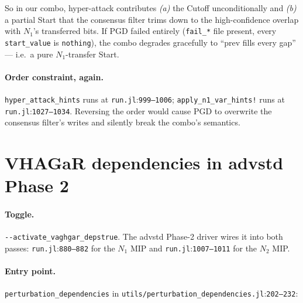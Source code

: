 \documentclass[11pt]{article}
\newcommand{\src}[1]{\texttt{\small #1}}
\newcommand{\flag}[1]{\texttt{-{}-#1}}
\newcommand{\fileline}[2]{\src{#1}:\src{#2}}
\begin{document}
So in our combo, hyper-attack contributes \emph{(a)} the Cutoff
unconditionally and \emph{(b)} a partial Start that the consensus
filter trims down to the high-confidence overlap with $N_1$'s
transferred bits. If PGD failed entirely (\src{fail\_*} file
present, every \src{start\_value} is \src{nothing}), the combo
degrades gracefully to ``prev fills every gap'' --- i.e.\ a pure
$N_1$-transfer Start.

\paragraph{Order constraint, again.} \src{hyper\_attack\_hints} runs
at \fileline{run.jl}{999--1006}; \src{apply\_n1\_var\_hints!} runs at
\fileline{run.jl}{1027--1034}. Reversing the order would cause PGD to
overwrite the consensus filter's writes and silently break the
combo's semantics.

\section{VHAGaR dependencies in advstd Phase 2}
\label{sec:vagharddeps}

\paragraph{Toggle.} \flag{activate\_vaghgar\_deps}\;\texttt{true}.
The advstd Phase-2 driver wires it into both passes:
\fileline{run.jl}{880--882} for the $N_1$ MIP and
\fileline{run.jl}{1007--1011} for the $N_2$ MIP.

\paragraph{Entry point.}
\src{perturbation\_dependencies} in
\fileline{utils/perturbation\_dependencies.jl}{202--232}:
\end{document}
